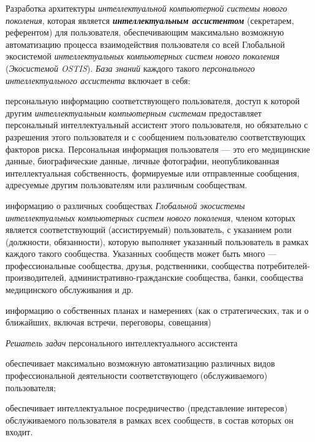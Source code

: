 \begin{textitemize}
	\medskip
	\item Разработка архитектуры \textit{интеллектуальной компьютерной системы нового поколения}, которая является \textbf{\textit{ интеллектуальным ассистентом}} (секретарем, референтом) для  пользователя, обеспечивающим максимально возможную автоматизацию процесса взаимодействия пользователя со всей Глобальной экосистемой \textit{интеллектуальных компьютерных систем нового поколения} (\textit{Экосистемой OSTIS}). \textit{База знаний} каждого такого \textit{персонального интеллектуального ассистента} включает в себя:
	\begin{textitemize}
		\item персональную информацию соответствующего пользователя, доступ к которой другим \textit{интеллектуальным компьютерным системам} предоставляет персональный интеллектуальный ассистент этого пользователя, но обязательно с разрешения этого пользователя и с сообщением пользователю соответствующих факторов риска. Персональная информация пользователя --- это его медицинские данные, биографические данные, личные фотографии, неопубликованная интеллектуальная собственность, формируемые или отправленные сообщения, адресуемые другим пользователям или различным сообществам.
		\item информацию о различных сообществах \textit{Глобальной экосистемы интеллектуальных компьютерных систем нового поколения}, членом которых является соответствующий (ассистируемый) пользователь, с указанием роли (должности, обязанности), которую выполняет указанный пользователь в рамках каждого такого сообщества. Указанных сообществ может быть много --- профессиональные сообщества, друзья, родственники, сообщества потребителей-производителей, административно-гражданские сообщества, банки, сообщества медицинского обслуживания и др.
		\item информацию о собственных планах и намерениях (как о стратегических, так и о ближайших, включая встречи, переговоры, совещания)
	\end{textitemize}
	\textit{Решатель задач} персонального интеллектуального ассистента
	\begin{textitemize}
		\item обеспечивает максимально возможную автоматизацию различных видов профессиональной   деятельности соответствующего (обслуживаемого) пользователя; 
		\item обеспечивает интеллектуальное посредничество (представление интересов) обслуживаемого пользователя в рамках всех сообществ, в состав которых он входит.

\end{textitemize}
\end{textitemize}
